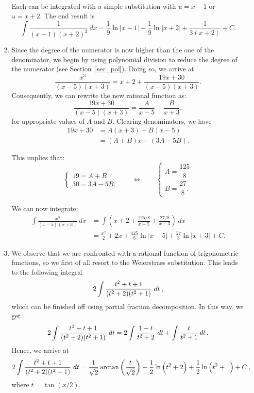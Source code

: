 \begin{example}
\begin{enumerate}
Each can be integrated with a simple substitution with $u=x-1$ or $u=x+2$. The end result is
$$\int\frac{1}{(x-1)(x+2)^2}\ dx = \frac19\ln|x-1| -\frac19\ln|x+2| +\frac1{3(x+2)}+C.$$
\item  Since the degree of the numerator is now higher than the one of the denominator, we begin by using polynomial division to reduce the degree of the numerator (see Section~\ref{sec_pol}). Doing so, we arrive at
$$\frac{x^3}{(x-5)(x+3)} = x+2+\frac{19x+30}{(x-5)(x+3)}.$$
Consequently, we can rewrite the new rational function as:
$$\frac{19x+30}{(x-5)(x+3)} = \frac{A}{x-5} + \frac{B}{x+3},$$ for appropriate values of $A$ and $B$. Clearing denominators, we have 
\begin{align*}
19x+30 &= A(x+3) + B(x-5)\\
			&= (A+B)x + (3A-5B).
\end{align*}

This implies that:
$$
\begin{cases}
19= A+B \\
30= 3A-5B.
\end{cases}
\qquad\Leftrightarrow\qquad
\begin{cases}
A=\dfrac{125}{8}\\[0.2cm]
B=\dfrac{27}{8}.
\end{cases}
$$

We can now integrate:
\begin{align*}
\int \frac{x^3}{(x-5)(x+3)}\ dx &= \int\left(x+2+\frac{125/8}{x-5}+\frac{27/8}{x+3}\right)\ dx \\[0.2cm]
					&= \frac{x^2}2 + 2x + \frac{125}{8}\ln|x-5| + \frac{27}8\ln|x+3| + C.
\end{align*}

\item We observe that we are confronted with a rational function of trigonometric functions, so we first of all resort to the Weierstrass substitution. This leads to the following integral
$$
2\ds \int \frac{t^2+t+1}{(t^2+2)(t^2+1)}\ dt\,,
$$
which can be finished off using partial fraction decomposition. In this way, we get
$$
2\ds \int \frac{t^2+t+1}{(t^2+2)(t^2+1)}\ dt=2\ds \int \frac{1-t}{t^2+2}\ dt+\int \frac{t}{t^2+1}\,dt\,.
$$
Hence, we arrive at
$$
2\ds \int \frac{t^2+t+1}{(t^2+2)(t^2+1)}\ dt=\dfrac{1}{\sqrt{2}}\arctan\left(\dfrac{t}{\sqrt{2}}\right)-\dfrac{1}{2}\ln\left(t^2+2\right)+\dfrac{1}{2}\ln\left(t^2+1\right)+C\,,
$$
where $t=\tan(x/2)$.

\end{enumerate}
\end{example}

